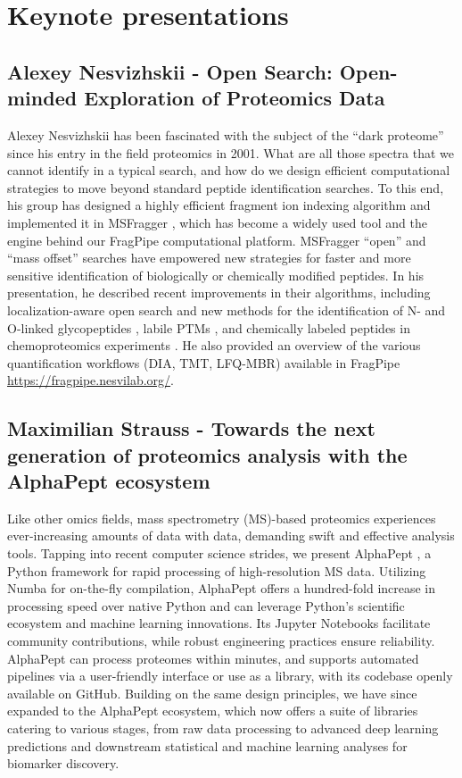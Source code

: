 \section{Keynote presentations}

\subsection{Alexey Nesvizhskii - Open Search: Open-minded Exploration of Proteomics Data}

Alexey Nesvizhskii  has been fascinated with the subject of the “dark proteome” since his entry in the field proteomics in 2001. What are all those spectra that we cannot identify in a typical search, and how do we design efficient computational strategies to move beyond standard peptide identification searches.  To this end, his group has designed a highly efficient fragment ion indexing algorithm and implemented it in MSFragger \citep{pmid28394336}, which has become a widely used tool and the engine behind our FragPipe computational platform. MSFragger “open” and “mass offset” searches have empowered new strategies for faster and more sensitive identification of biologically or chemically modified peptides. In his presentation, he described recent improvements in their algorithms, including localization-aware open search \citep{pmid32792501} and new methods for the identification of N- and O-linked glycopeptides \citep{pmid33020657}, labile PTMs \citep{pmid37004988}, and chemically labeled peptides in chemoproteomics experiments \citep{pmid37438360}. He  also provided an overview of the various quantification workflows (DIA, TMT, LFQ-MBR) available in FragPipe \url{https://fragpipe.nesvilab.org/}.


\subsection{Maximilian Strauss - Towards the next generation of proteomics analysis with the AlphaPept ecosystem}

Like other omics fields, mass spectrometry (MS)-based proteomics experiences ever-increasing amounts of data with data, demanding swift and effective analysis tools. Tapping into recent computer science strides, we present AlphaPept \citep{Strauss2024}, a Python framework for rapid processing of high-resolution MS data. Utilizing Numba for on-the-fly compilation, AlphaPept offers a hundred-fold increase in processing speed over native Python and can leverage Python's scientific ecosystem and machine learning innovations. Its Jupyter Notebooks facilitate community contributions, while robust engineering practices ensure reliability. AlphaPept can process proteomes within minutes, and supports automated pipelines via a user-friendly interface or use as a library, with its codebase openly available on GitHub. Building on the same design principles, we have since expanded to the AlphaPept ecosystem, which now offers a suite of libraries catering to various stages, from raw data processing to advanced deep learning predictions and downstream statistical and machine learning analyses for biomarker discovery.

